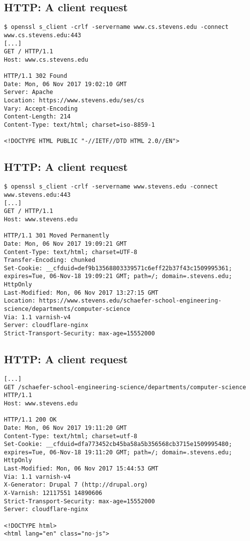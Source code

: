 \documentclass[xga]{xdvislides}
\begin{document}
\subsection{HTTP: A client request}
\smallish
\begin{verbatim}
$ openssl s_client -crlf -servername www.cs.stevens.edu -connect www.cs.stevens.edu:443
[...]
GET / HTTP/1.1
Host: www.cs.stevens.edu

HTTP/1.1 302 Found
Date: Mon, 06 Nov 2017 19:02:10 GMT
Server: Apache
Location: https://www.stevens.edu/ses/cs
Vary: Accept-Encoding
Content-Length: 214
Content-Type: text/html; charset=iso-8859-1

<!DOCTYPE HTML PUBLIC "-//IETF//DTD HTML 2.0//EN">
\end{verbatim}
\Normalsize

\subsection{HTTP: A client request}
\smallish
\begin{verbatim}
$ openssl s_client -crlf -servername www.stevens.edu -connect www.stevens.edu:443
[...]
GET / HTTP/1.1
Host: www.stevens.edu

HTTP/1.1 301 Moved Permanently
Date: Mon, 06 Nov 2017 19:09:21 GMT
Content-Type: text/html; charset=UTF-8
Transfer-Encoding: chunked
Set-Cookie: __cfduid=def9b13568803339571c6eff22b37f43c1509995361;
expires=Tue, 06-Nov-18 19:09:21 GMT; path=/; domain=.stevens.edu; HttpOnly
Last-Modified: Mon, 06 Nov 2017 13:27:15 GMT
Location: https://www.stevens.edu/schaefer-school-engineering-science/departments/computer-science
Via: 1.1 varnish-v4
Server: cloudflare-nginx
Strict-Transport-Security: max-age=15552000
\end{verbatim}
\Normalsize


\subsection{HTTP: A client request}
\smallish
\begin{verbatim}
[...]
GET /schaefer-school-engineering-science/departments/computer-science HTTP/1.1
Host: www.stevens.edu

HTTP/1.1 200 OK
Date: Mon, 06 Nov 2017 19:11:20 GMT
Content-Type: text/html; charset=utf-8
Set-Cookie: __cfduid=dfa773452cb45ba58a5b356568cb3715e1509995480;
expires=Tue, 06-Nov-18 19:11:20 GMT; path=/; domain=.stevens.edu; HttpOnly
Last-Modified: Mon, 06 Nov 2017 15:44:53 GMT
Via: 1.1 varnish-v4
X-Generator: Drupal 7 (http://drupal.org)
X-Varnish: 12117551 14890606
Strict-Transport-Security: max-age=15552000
Server: cloudflare-nginx

<!DOCTYPE html>
<html lang="en" class="no-js">
\end{verbatim}
\Normalsize
\end{document}
